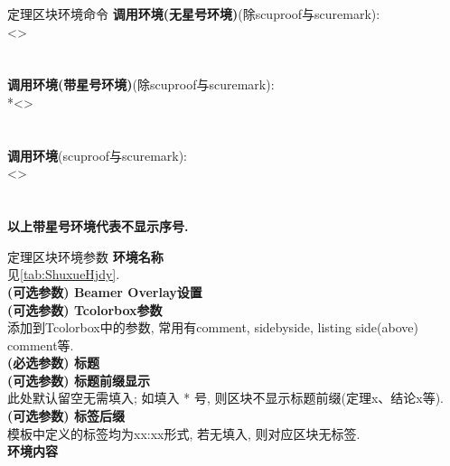 \documentclass[hyperref, UTF8, CJK, aspectratio=169]{beamer}
\begin{document}
\begin{frame}{定理区块环境命令}
	\textbf{调用环境(无星号环境)}(除scuproof与scuremark):\\
	\textcolor{scugrey}{<>}\textcolor{scugrey}{}\\
	\hspace*{1em}\\
	\\[1ex]
	\textbf{调用环境(带星号环境)}(除scuproof与scuremark):\\
	*\textcolor{scugrey}{<>}\textcolor{scugrey}{}\\
	\hspace*{1em}\\
	\\[1ex]
	\textbf{调用环境}(scuproof与scuremark):\\
	\textcolor{scugrey}{<>}\\
	\hspace*{1em}\\
	\\[1ex]
	\textbf{以上带星号环境代表不显示序号.}
\end{frame}

\begin{frame}{定理区块环境参数}
	\alert{}\hfill \textbf{环境名称}\\
	见\vref{tab:ShuxueHjdy}.\\
	
	\alert{}\hfill \textbf{(可选参数) Beamer Overlay设置}\\
	
	\alert{}\hfill \textbf{(可选参数) Tcolorbox参数}\\
	添加到Tcolorbox中的参数, 常用有comment, sidebyside, listing side(above) comment等.\\
	
	\alert{}\hfill \textbf{(必选参数) 标题}\\
	
	\alert{}\hfill \textbf{(可选参数) 标题前缀显示}\\
	此处默认留空无需填入; 如填入 * 号, 则区块不显示标题前缀(定理x、结论x等).\\	
	
	\alert{}\hfill \textbf{(可选参数) 标签后缀}\\
	模板中定义的标签均为xx:xx形式, 若无填入, 则对应区块无标签.\\
		
	\alert{}\hfill \textbf{环境内容}
\end{frame}
\end{document}
